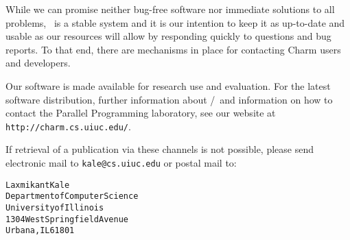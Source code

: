 While we can promise neither bug-free software nor immediate solutions   
to all problems, \charmpp\ is a stable system and it is our intention to
keep it as up-to-date and usable as our resources will allow
by responding quickly to questions and bug reports.  To that
end, there are mechanisms in place for contacting Charm users
and developers. 

Our software is made available for research use and evaluation.
For the latest software distribution, further information about
\converse{}/\charmpp\ and information on how to contact the Parallel
Programming laboratory, see our website at \texttt{http://charm.cs.uiuc.edu/}.

If retrieval of a publication via these channels is not possible,
please send electronic mail to \texttt{kale@cs.uiuc.edu} or postal mail to:

\begin{alltt}
   Laxmikant Kale
   Department of Computer Science 
   University of Illinois 
   1304 West Springfield Avenue 
   Urbana, IL 61801 
\end{alltt}
